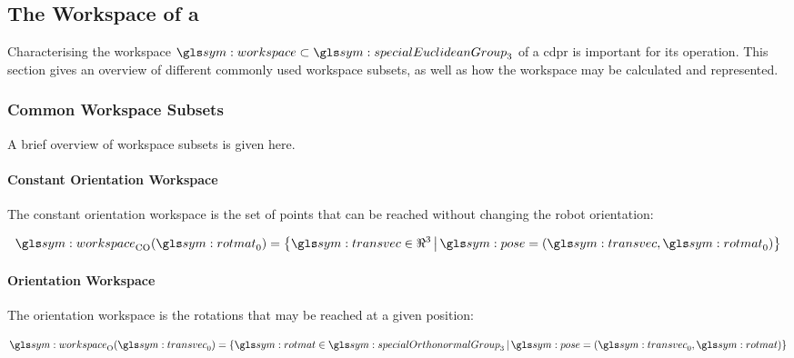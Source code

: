     \subsection{The Workspace of a }%
    \label{sec:the_workspace_of_a_cdpr}

        Characterising the workspace
		$\workspace\subset\specialEuclideanGroup{3}$   of	a	\gls{cdpr}	  is
        important for its operation. This section gives an overview of different
		commonly used workspace subsets, as well as how  the  workspace  may  be
        calculated and represented.

        \subsubsection{Common Workspace Subsets}%
        \label{sec:common_workspace_subsets}

			A	brief	overview   of	workspace	subsets   is   given   here.

            \paragraph{Constant Orientation Workspace}%
            \label{sec:constant_orientation_workspace}

				The constant orientation workspace is the set of points that can
				be	 reached   without	 changing	the    robot	orientation:

                \begin{equation}
                    \workspace_{\mathrm{CO}}(\rotmatbare_0) =
                        \left\{
                            \transvec\in\Re^3
                            \,\middle|\,
                            \pose = (\transvec, \rotmatbare_0)
                        \right\}
                \end{equation}

            \paragraph{Orientation Workspace}%
            \label{sec:orientation_workspace}

				The orientation workspace is the rotations that may  be  reached
                at a given position:

                \begin{equation}
                    \workspace_{\mathrm{O}}(\transvec_0) =
                        \left\{
                            \rotmatbare\in\specialOrthonormalGroup{3}
                            \,\middle|\,
                            \pose = (\transvec_0, \rotmatbare)
                        \right\}
                \end{equation}

